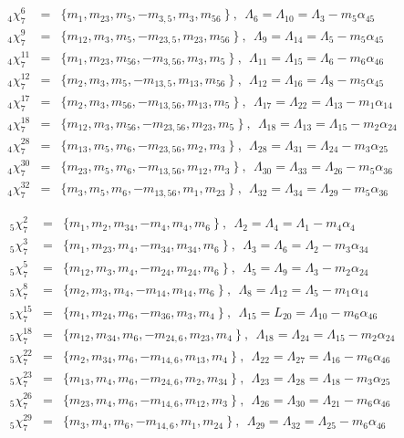 \documentclass[a4paper]{jpconf}
\def\np{\newpage}
\def\bb {\begin {eqnarray}}
\def\eqnn#1{\bb\label{#1}}
\def\eea {\end {eqnarray}}
\def\nn{\nonumber}
\def\np{\vfill\eject}
\def\a{\alpha}
\def\L{\Lambda}
\begin{document}
\eqnn{slt74}
 _4\chi^6_7 &=& \{ m_1, m_{23}, m_{5}, -m_{3,5}, m_{3}, m_{56} \   \} \ ,~~\L_6 = \L_{10} =\L_3 - m_5 \a_{45} \\ %
 _4\chi^9_7 &=& \{ m_{12}, m_{3}, m_{5}, -m_{23,5}, m_{23}, m_{56} \   \} \ ,~~\L_9 = \L_{14} = \L_5 - m_5 \a_{45} \nn\\ %
 _4\chi^{11}_7 &=& \{ m_1, m_{23}, m_{56}, -m_{3,56}, m_{3}, m_{5} \   \} \ ,~~\L_{11} = \L_{15} = \L_6 - m_6 \a_{46}  \nn\\ %
_4\chi^{12}_7 &=& \{ m_2, m_{3}, m_{5}, -m_{13,5}, m_{13}, m_{56} \   \} \ ,~~\L_{12} = \L_{16} =\L_8 - m_5 \a_{45} \nn\\ %
   _4\chi^{17}_7 &=& \{ m_{2}, m_{3}, m_{56}, -m_{13,56}, m_{13}, m_{5} \   \} \ ,~~\L_{17} = \L_{22} =\L_{13} - m_1 \a_{14} \nn\\ %
_4\chi^{18}_7 &=& \{ m_{12}, m_{3}, m_{56}, -m_{23,56}, m_{23}, m_{5} \   \} \ ,~~\L_{18} = \L_{13} =\L_{15} - m_2 \a_{24}  \nn\\ %
   _4\chi^{28}_7 &=& \{ m_{13}, m_{5}, m_{6}, -m_{23,56}, m_{2}, m_{3} \   \} \ ,~~\L_{28} = \L_{31} =\L_{24} - m_3 \a_{25}  \nn\\ %
 _4\chi^{30}_7 &=& \{ m_{23}, m_{5}, m_{6}, -m_{13,56}, m_{12}, m_{3} \   \} \ ,~~\L_{30} = \L_{33} =\L_{26} - m_5 \a_{36} \nn\\ %
 _4\chi^{32}_7 &=& \{ m_{3}, m_{5}, m_{6}, -m_{13,56}, m_{1}, m_{23} \   \} \ ,~~\L_{32} = \L_{34} =\L_{29} - m_5 \a_{36}
   \nn\eea %

 \eqnn{slt75}
  _5\chi^2_7 &=& \{ m_1, m_2, m_{34}, -m_4, m_{4}, m_6 \   \} \ ,~~\L_2 = \L_4 =\L_1 - m_4 \a_4 \\ %
 _5\chi^3_7 &=& \{ m_1, m_{23}, m_{4}, -m_{34}, m_{34}, m_6 \   \} \ ,~~\L_3 = \L_6 = \L_2 - m_3 \a_{34} \nn\\ %
    _5\chi^5_7 &=& \{ m_{12}, m_{3}, m_{4}, -m_{24}, m_{24}, m_6 \   \} \ ,~~\L_5 = \L_9 = \L_3 - m_2 \a_{24} \nn\\ %
  _5\chi^8_7 &=& \{ m_2, m_{3}, m_{4}, -m_{14}, m_{14}, m_6 \   \} \ ,~~\L_8 =\L_{12} =  \L_5 - m_1 \a_{14} \nn\\ %
  _5\chi^{15}_7 &=& \{ m_1, m_{24}, m_{6}, -m_{36}, m_{3}, m_{4} \   \} \ ,~~\L_{15} = L_{20} =\L_{10} - m_6 \a_{46}  \nn\\ %
 _5\chi^{18}_7 &=& \{ m_{12}, m_{34}, m_{6}, -m_{24,6}, m_{23}, m_{4} \   \} \ ,~~\L_{18} =\L_{24} =  \L_{15} - m_2 \a_{24}  \nn\\ %
  _5\chi^{22}_7 &=& \{ m_{2}, m_{34}, m_{6}, -m_{14,6}, m_{13}, m_{4} \   \} \ ,~~\L_{22} = \L_{27} = \L_{16} - m_6 \a_{46} \nn\\ %
_5\chi^{23}_7 &=& \{ m_{13}, m_{4}, m_{6}, -m_{24,6}, m_{2}, m_{34} \   \} \ ,~~\L_{23} = \L_{28} = \L_{18} - m_3 \a_{25}  \nn\\ %
  _5\chi^{26}_7 &=& \{ m_{23}, m_{4}, m_{6}, -m_{14,6}, m_{12}, m_{3} \   \} \ ,~~\L_{26} = \L_{30} =\L_{21} - m_6 \a_{46} \nn\\ %
   _5\chi^{29}_7 &=& \{ m_{3}, m_{4}, m_{6}, -m_{14,6}, m_{1}, m_{24} \   \} \ ,~~\L_{29} = \L_{32} = \L_{25} - m_6 \a_{46}
   \nn\eea %
\end{document}
